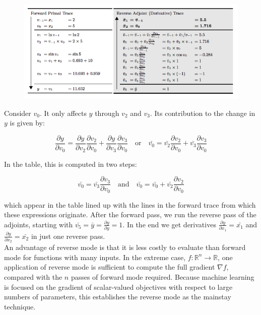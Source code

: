 \documentclass[11pt]{article}
\theoremstyle{definition}
\theoremstyle{plain}
\renewcommand{\b}[1]{\mathbb{#1}}
\begin{document}
\begin{figure}[H]
\includegraphics[width=14cm]{reverse}
\centering
\end{figure}

\noindent Consider $v_0$. It only affects $y$ through $v_2$ and $v_3$. Its
contribution to the change in $y$ is given by:

$$ \frac{\partial y}{\partial v_0} = \frac{\partial y}{\partial v_2} 
                                     \frac{\partial v_2}{\partial v_0} 
                                    +
                                     \frac{\partial y}{\partial v_3}
                                     \frac{\partial v_3}{\partial v_0}
\quad \text{or} \quad
\bar{v_0} = \bar{v_2} \frac{\partial v_2}{\partial v_0} 
             + \bar{v_3} \frac{\partial v_3}{\partial v_0} $$

\noindent In the table, this is computed in two steps:


$$ \bar{v_0} = \bar{v_3} \frac{\partial v_3}{\partial v_0} \quad \text{and} \quad
   \bar{v_0} = \bar{v_0} + \bar{v_2} \frac{\partial v_2}{\partial v_0} $$

\noindent which appear in the table lined up with the lines in the forward trace
from which these expressions originate. After the forward pass, we run
the reverse pass of the adjoints, starting with $\bar{v_5} = \bar{y} =
\frac{\partial y}{\partial y} = 1$. In the end we get derivatives
$\frac{\partial y}{\partial x_1} = \bar{x_1}$ and $\frac{\partial y}{\partial x_2} =
\bar{x_2}$ in just one reverse pass.\\

\noindent An advantage of reverse mode is that it is less costly to evaluate
than forward mode for functions with many inputs. In the extreme case,
$f: \b{R}^n \rightarrow \b{R}$, one application of reverse mode is sufficient
to compute the full gradient $\nabla f$, compared with the $n$ passes of
forward mode required. Because machine learning is focused on the
gradient of scalar-valued objectives with respect to large numbers of
parameters, this establishes the reverse mode as the mainstay technique.
\end{document}
